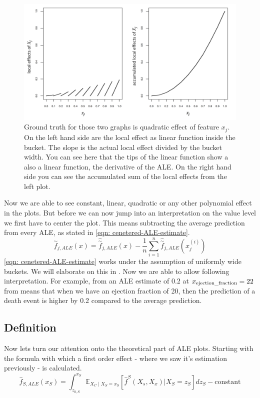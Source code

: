\documentclass[11pt,
  a4paper,
  parskip=half, %
  BCOR=10mm, %
  english,
  ]{article}
\begin{document}
\begin{figure}
    \centering
    \includegraphics[width=0.7\linewidth]{images/local_effects.png}
    \caption{Ground truth for those two graphs is quadratic effect of feature $x_j$. On the left hand side are the local effect as linear function inside the bucket. The slope is the actual local effect divided by the bucket width. You can see here that the tips of the linear function show a also a linear function, the derivative of the ALE. On the right hand side you can see the accumulated sum of the local effects from the left plot.}
    \label{fig:local-effects}
\end{figure}

Now we are able to see constant, linear, quadratic or any other polynomial effect in the plots. But before we can now jump into an interpretation on the value level we first have to center the plot. This means subtracting the average prediction from every ALE, as stated in \eqref{eqn: cenetered-ALE-estimate}. \cite{molnar2022}
\begin{equation} \label{eqn: cenetered-ALE-estimate}
    \overset{\sim}{f}_{j, ALE}(x) = \hat{\overset{\sim}{f}}_{j, ALE}(x) - \frac{1}{n} \sum_{i=1}^n \hat{\overset{\sim}{f}}_{j, ALE}(x_j^{(i)})
\end{equation}
\eqref{eqn: cenetered-ALE-estimate} works under the assumption of uniformly wide buckets. We will elaborate on this in . 
Now we are able to allow following interpretation. For example, from  an ALE estimate of $0.2$ at $x_\text{ejection\textunderscore fraction}=22$ from  means that when we have an ejection fraction of 20, then the prediction of a death event is higher by 0.2 compared to the average prediction.


\subsection{Definition}
Now lets turn our attention onto the theoretical part of ALE plots. Starting with the formula with which a first order effect - where we saw it's estimation previously - is calculated. \cite{molnar2022}
\begin{equation}
    \hat{f}_{S, ALE}(x_S) = \int_{z_{0, S}}^{x_S} \mathbb{E}_{X_C \mid  X_S=x_S}\left[\hat{f}^S(X_s, X_x) | X_S = z_S\right] dz_S - \text{constant}
\end{equation}
\end{document}

